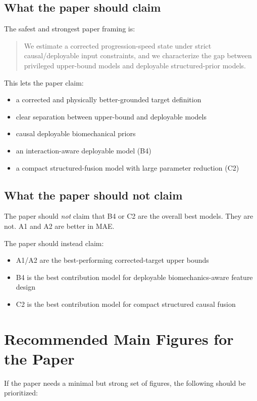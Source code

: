 \documentclass[11pt,a4paper]{article}
\begin{document}
\subsection{What the paper should claim}

The safest and strongest paper framing is:

\begin{quote}
We estimate a corrected progression-speed state under strict causal/deployable input constraints, and we characterize the gap between privileged upper-bound models and deployable structured-prior models.
\end{quote}

This lets the paper claim:
\begin{itemize}
\item a corrected and physically better-grounded target definition
\item clear separation between upper-bound and deployable models
\item causal deployable biomechanical priors
\item an interaction-aware deployable model (B4)
\item a compact structured-fusion model with large parameter reduction (C2)
\end{itemize}

\subsection{What the paper should not claim}

The paper should \emph{not} claim that B4 or C2 are the overall best models.
They are not. A1 and A2 are better in MAE.

The paper should instead claim:
\begin{itemize}
\item A1/A2 are the best-performing corrected-target upper bounds
\item B4 is the best contribution model for deployable biomechanics-aware feature design
\item C2 is the best contribution model for compact structured causal fusion
\end{itemize}

\section{Recommended Main Figures for the Paper}

If the paper needs a minimal but strong set of figures, the following should be prioritized:
\end{document}
